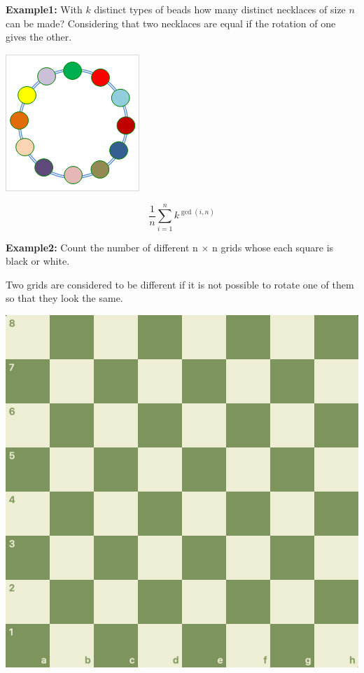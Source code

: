     \textbf{Example1:} With $k$ distinct types of beads how many distinct necklaces of size $n$ can be made? Considering that two necklaces are equal if the rotation of one gives the other.
    
	\begin{center}
    \includegraphics[scale=.6, keepaspectratio]{content/math/Burnside-Necklace.png}
    \end{center}
	$$\frac{1}{n} \sum_{i=1}^n k^{\gcd(i, n)}$$

	\textbf{Example2:} Count the number of different n $\times$ n grids whose each square is black or white.

	Two grids are considered to be different if it is not possible to rotate one of them so that they look the same.
	
	\begin{center}
	\includegraphics[scale=.1, keepaspectratio]{content/math/Burnside-Grid.png}
	\end{center}

